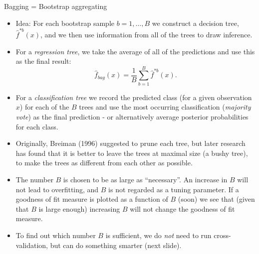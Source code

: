 \documentclass[10pt,ignorenonframetext,]{beamer}
\begin{document}
\begin{frame}

\begin{block}{Bagging = Bootstrap aggregating}

\begin{itemize}
\item
  Idea: For each bootstrap sample \(b=1,\ldots, B\) we construct a
  decision tree, \(\hat{f}^{*b}(x)\), and we then use information from
  all of the trees to draw inference.
\item
  For a \emph{regression tree}, we take the average of all of the
  predictions and use this as the final result: \[
  \hat{f}_{bag}(x)=\frac{1}{B}\sum_{b=1}^B \hat{f}^{*b}(x).
  \]
\item
  For a \emph{classification tree} we record the predicted class (for a
  given observation \(x\)) for each of the \(B\) trees and use the most
  occurring classification (\emph{majority vote}) as the final
  prediction - or alternatively average posterior probabilities for each
  class.
\end{itemize}

\end{block}

\end{frame}

\begin{frame}

\begin{itemize}
\item
  Originally, Breiman (1996) suggested to prune each tree, but later
  research has found that it is better to leave the trees at maximal
  size (a bushy tree), to make the trees as different from each other as
  possible.
\item
  The number \(B\) is chosen to be as large as ``necessary''. An
  increase in \(B\) will not lead to overfitting, and \(B\) is not
  regarded as a tuning parameter. If a goodness of fit measure is
  plotted as a function of \(B\) (soon) we see that (given that \(B\) is
  large enough) increasing \(B\) will not change the goodness of fit
  measure.
\item
  To find out which number \(B\) is sufficient, we do \emph{not} need to
  run cross-validation, but can do something smarter (next slide).
\end{itemize}

\end{frame}
\end{document}
